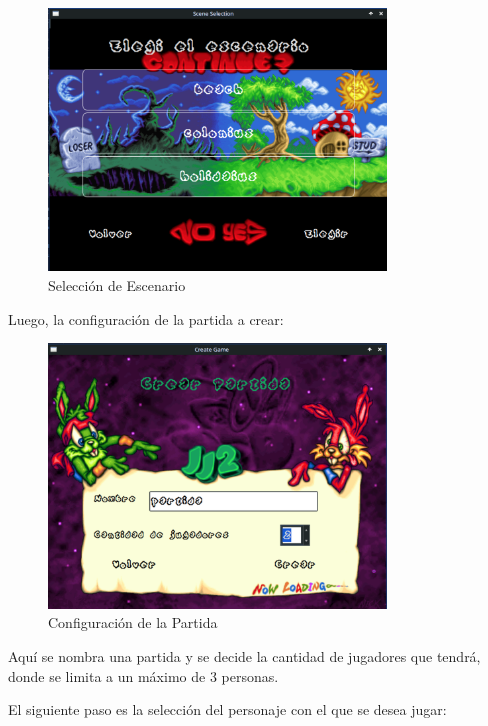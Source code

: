 \documentclass[titlepage,a4paper]{article}
\begin{document}
\begin{figure}[H]
  \centering
  \includegraphics[width=0.8\textwidth]{images/Lobby/SceneSelection.png}
  \caption{Selección de Escenario}
  \label{fig:scene}
\end{figure}

Luego, la configuración de la partida a crear:

\begin{figure}[H]
  \centering
  \includegraphics[width=0.8\textwidth]{images/Lobby/CreateGame.png}
  \caption{Configuración de la Partida}
  \label{fig:create}
\end{figure}

Aquí se nombra una partida y se decide la cantidad de jugadores que tendrá, donde se limita a un máximo de 3 personas.

El siguiente paso es la selección del personaje con el que se desea jugar:
\end{document}
